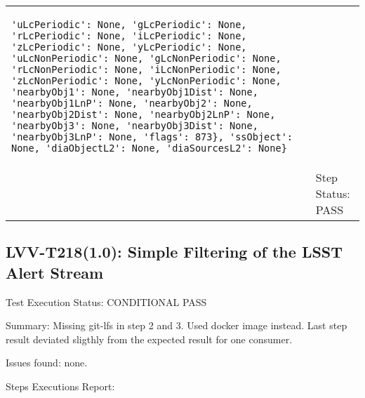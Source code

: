 \documentclass[DM,lsstdraft,STR,toc]{lsstdoc}
\begin{document}
\begin{longtable}{p{2cm}p{14cm}}
\begin{verbatim}
'uLcPeriodic': None, 'gLcPeriodic': None, 'rLcPeriodic': None, 'iLcPeriodic': None, 'zLcPeriodic': None, 'yLcPeriodic': None, 'uLcNonPeriodic': None, 'gLcNonPeriodic': None, 'rLcNonPeriodic': None, 'iLcNonPeriodic': None, 'zLcNonPeriodic': None, 'yLcNonPeriodic': None, 'nearbyObj1': None, 'nearbyObj1Dist': None, 'nearbyObj1LnP': None, 'nearbyObj2': None, 'nearbyObj2Dist': None, 'nearbyObj2LnP': None, 'nearbyObj3': None, 'nearbyObj3Dist': None, 'nearbyObj3LnP': None, 'flags': 873}, 'ssObject': None, 'diaObjectL2': None, 'diaSourcesL2': None}

\end{verbatim}

 \\\cline{2-2}
  & Step Status: PASS \\\hline
\end{longtable}




\subsection{LVV-T218(1.0): Simple Filtering of the LSST Alert Stream}
\label{sect:detail-lvv-t216}

Test Execution Status: CONDITIONAL PASS

Summary: Missing git-lfs in step 2 and 3. Used docker image instead. Last step result deviated sligthly from the expected result for one consumer.

Issues found: none.

Steps Executions Report:
\end{document}
